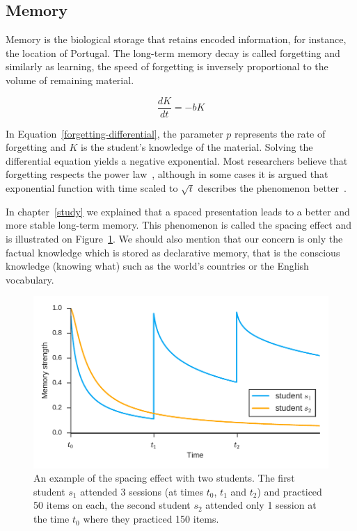 \subsection{Memory}
\label{memory}

Memory is the biological storage that retains encoded information, for instance, the location of Portugal. The long-term memory decay is called forgetting and similarly as learning, the speed of forgetting is inversely proportional to the volume of remaining material.

\begin{equation} \label{forgetting-differential}
  \frac{dK}{dt} = -bK
\end{equation}

In Equation~\ref{forgetting-differential}, the parameter $p$ represents the rate of forgetting and $K$ is the student's knowledge of the material. Solving the differential equation yields a negative exponential. Most researchers believe that forgetting respects the power law~\cite{MichaelW.Eysenck2008}, although in some cases it is argued that exponential function with time scaled to $\sqrt{t}$ describes the phenomenon better~\cite{White2001}.

In chapter~\ref{study} we explained that a spaced presentation leads to a better and more stable long-term memory. This phenomenon is called the spacing effect and is illustrated on Figure~\ref{fig:spacing-effect}. We should also mention that our concern is only the factual knowledge which is stored as declarative memory, that is the conscious knowledge (knowing what) such as the world's countries or the English vocabulary.

\begin{figure}[htbp]
  \centering
  \includegraphics[width=\textwidth]{img/spacing-effect}
  \caption{An example of the spacing effect with two students. The first student $s_1$ attended 3 sessions (at times $t_0$, $t_1$ and $t_2$) and practiced 50 items on each, the second student $s_2$ attended only 1 session at the time $t_0$ where they practiced 150 items.}
  \label{fig:spacing-effect}
\end{figure}

